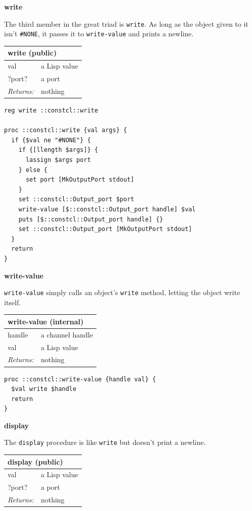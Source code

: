 \documentclass[twoside,9pt]{report}
\begin{document}
\textbf{write}


The third member in the great triad is \texttt{write}. As long as the object given to it isn't \texttt{\#NONE}, it passes it to \texttt{write-value} and prints a newline.

\begin{tabular}{ |l l| }
\hline
\multicolumn{2}{|l|}{write (public)} \\
\hline
val & a Lisp value \\
?port? & a port \\
\textit{Returns:} & nothing \\
\hline
\end{tabular}

\noindent\makebox[\linewidth]{\rule{\linewidth}{0.4pt}}
\begin{lstlisting}
reg write ::constcl::write
 
proc ::constcl::write {val args} {
  if {$val ne "#NONE"} {
    if {[llength $args]} {
      lassign $args port
    } else {
      set port [MkOutputPort stdout]
    }
    set ::constcl::Output_port $port
    write-value [$::constcl::Output_port handle] $val
    puts [$::constcl::Output_port handle] {}
    set ::constcl::Output_port [MkOutputPort stdout]
  }
  return
}
\end{lstlisting}
\noindent\makebox[\linewidth]{\rule{\linewidth}{0.4pt}}

\textbf{write-value}


\texttt{write-value} simply calls an object's \texttt{write} method, letting the object write itself.

\begin{tabular}{ |l l| }
\hline
\multicolumn{2}{|l|}{write-value (internal)} \\
\hline
handle & a channel handle \\
val & a Lisp value \\
\textit{Returns:} & nothing \\
\hline
\end{tabular}

\noindent\makebox[\linewidth]{\rule{\linewidth}{0.4pt}}
\begin{lstlisting}
proc ::constcl::write-value {handle val} {
  $val write $handle
  return
}
\end{lstlisting}
\noindent\makebox[\linewidth]{\rule{\linewidth}{0.4pt}}

\textbf{display}


The \texttt{display} procedure is like \texttt{write} but doesn't print a newline.

\begin{tabular}{ |l l| }
\hline
\multicolumn{2}{|l|}{display (public)} \\
\hline
val & a Lisp value \\
?port? & a port \\
\textit{Returns:} & nothing \\
\hline
\end{tabular}
\end{document}
